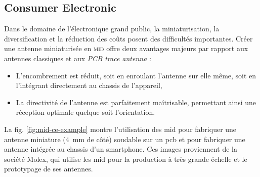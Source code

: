 \subsection{Consumer Electronic}
Dans le domaine de l'électronique grand public, la miniaturisation, la diversification et la réduction des coûts posent des difficultés importantes.
Créer une antenne miniaturisée en \textsc{mid} offre deux avantages majeurs par rapport aux antennes classiques et aux \textit{PCB trace antenna} :
\begin{itemize}
    \item L'encombrement est réduit, soit en enroulant l'antenne sur elle même, soit en l'intégrant directement au chassis de l'appareil,
    \item La directivité de l'antenne est parfaitement maîtrisable, permettant ainsi une réception optimale quelque soit l'orientation.
\end{itemize}
La fig. \ref{fig:mid-ce-example} montre l'utilisation des \gls{mid} pour fabriquer une antenne miniature (\SI{4}{\milli\meter} de côté) soudable sur un \gls{pcb} et pour fabriquer une antenne intégrée au chassis d'un smartphone.
Ces images proviennent de la société Molex, qui utilise les \gls{mid} pour la production à très grande échelle et le prototypage de ses antennes.

